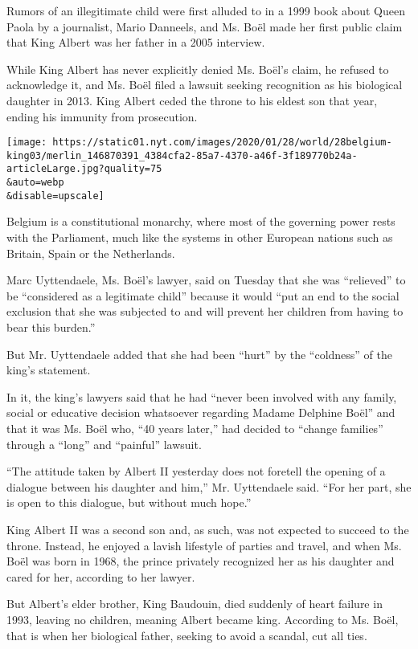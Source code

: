 Rumors of an illegitimate child were first alluded to in a 1999 book
about Queen Paola by a journalist, Mario Danneels, and Ms. Boël made her
first public claim that King Albert was her father in a 2005 interview.

While King Albert has never explicitly denied Ms. Boël's claim, he
refused to acknowledge it, and Ms. Boël filed a lawsuit seeking
recognition as his biological daughter in 2013. King Albert ceded the
throne to his eldest son that year, ending his immunity from
prosecution.

\texttt{[image: https://static01.nyt.com/images/2020/01/28/world/28belgium-king03/merlin\_146870391\_4384cfa2-85a7-4370-a46f-3f189770b24a-articleLarge.jpg?quality=75\\\&auto=webp\\\&disable=upscale]}

Belgium is a constitutional monarchy, where most of the governing power
rests with the Parliament, much like the systems in other European
nations such as Britain, Spain or the Netherlands.

Marc Uyttendaele, Ms. Boël's lawyer, said on Tuesday that she was
``relieved'' to be ``considered as a legitimate child'' because it would
``put an end to the social exclusion that she was subjected to and will
prevent her children from having to bear this burden.''

But Mr. Uyttendaele added that she had been ``hurt'' by the ``coldness''
of the king's statement.

In it, the king's lawyers said that he had ``never been involved with
any family, social or educative decision whatsoever regarding Madame
Delphine Boël'' and that it was Ms. Boël who, ``40 years later,'' had
decided to ``change families'' through a ``long'' and ``painful''
lawsuit.

``The attitude taken by Albert II yesterday does not foretell the
opening of a dialogue between his daughter and him,'' Mr. Uyttendaele
said. ``For her part, she is open to this dialogue, but without much
hope.''

King Albert II was a second son and, as such, was not expected to
succeed to the throne. Instead, he enjoyed a lavish lifestyle of parties
and travel, and when Ms. Boël was born in 1968, the prince privately
recognized her as his daughter and cared for her, according to her
lawyer.

But Albert's elder brother, King Baudouin, died suddenly of heart
failure in 1993, leaving no children, meaning Albert became king.
According to Ms. Boël, that is when her biological father, seeking to
avoid a scandal, cut all ties.


